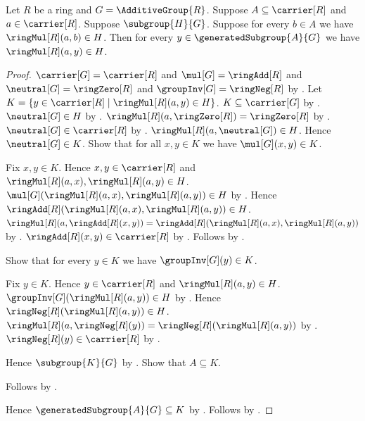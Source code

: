 \begin{lemma}\label{generated_subgroup_closed_under_left_ring_multiplication}
    Let $R$ be a ring and $G=\AdditiveGroup{R}$.
    Suppose $A\subseteq\carrier[R]$ and $a\in\carrier[R]$.
    Suppose $\subgroup{H}{G}$.
    Suppose for every $b\in A$ we have $\ringMul[R](a,b)\in H$.
    Then for every $y\in\generatedSubgroup{A}{G}$ we have
        $\ringMul[R](a,y)\in H$.
\end{lemma}
\begin{proof}
    $\carrier[G]=\carrier[R]$ and
        $\mul[G]=\ringAdd[R]$ and
        $\neutral[G]=\ringZero[R]$ and
        $\groupInv[G]=\ringNeg[R]$ by
        .
    Let $K=\{y\in\carrier[R]\mid \ringMul[R](a,y)\in H\}$.
    $K\subseteq\carrier[G]$ by .
    $\neutral[G]\in H$ by .
    $\ringMul[R](a,\ringZero[R])=\ringZero[R]$ by
        .
    $\neutral[G]\in\carrier[R]$ by .
    $\ringMul[R](a,\neutral[G])\in H$.
    Hence $\neutral[G]\in K$.
    Show that for all $x,y\in K$ we have $\mul[G](x,y)\in K$.
    \begin{subproof}
        Fix $x,y\in K$.
        Hence $x,y\in\carrier[R]$ and
            $\ringMul[R](a,x),\ringMul[R](a,y)\in H$.
        $\mul[G](\ringMul[R](a,x),\ringMul[R](a,y))\in H$ by
            .
        Hence $\ringAdd[R](\ringMul[R](a,x),\ringMul[R](a,y))\in H$.
        $\ringMul[R](a,\ringAdd[R](x,y))
            =\ringAdd[R](\ringMul[R](a,x),\ringMul[R](a,y))$ by
            .
        $\ringAdd[R](x,y)\in\carrier[R]$ by .
        Follows by \auto.
    \end{subproof}
    Show that for every $y\in K$ we have $\groupInv[G](y)\in K$.
    \begin{subproof}
        Fix $y\in K$.
        Hence $y\in\carrier[R]$ and $\ringMul[R](a,y)\in H$.
        $\groupInv[G](\ringMul[R](a,y))\in H$ by
            .
        Hence $\ringNeg[R](\ringMul[R](a,y))\in H$.
        $\ringMul[R](a,\ringNeg[R](y))
            =\ringNeg[R](\ringMul[R](a,y))$ by
            .
        $\ringNeg[R](y)\in\carrier[R]$ by .
    \end{subproof}
    Hence $\subgroup{K}{G}$ by .
    Show that $A\subseteq K$.
    \begin{subproof}
        Follows by .
    \end{subproof}
    Hence $\generatedSubgroup{A}{G}\subseteq K$ by
        .
    Follows by .
\end{proof}

